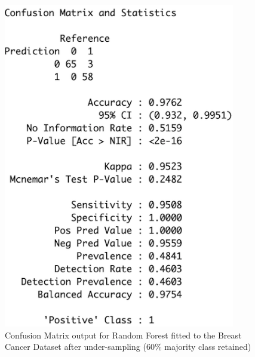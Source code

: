 \begin{figure}[!htbp]
\begin{minipage}{0.45\textwidth}
        \includegraphics[width=0.9\textwidth]{ThesisTemplate/appendix/images/Chapter5Appendix/ConfusionMatrix60/BreastCancer.png}
        \caption{Confusion Matrix output for Random Forest fitted to the Breast Cancer Dataset after under-sampling (60\% majority class retained)}
        \label{fig:matrixBC60}
    \end{minipage}
\end{figure}

